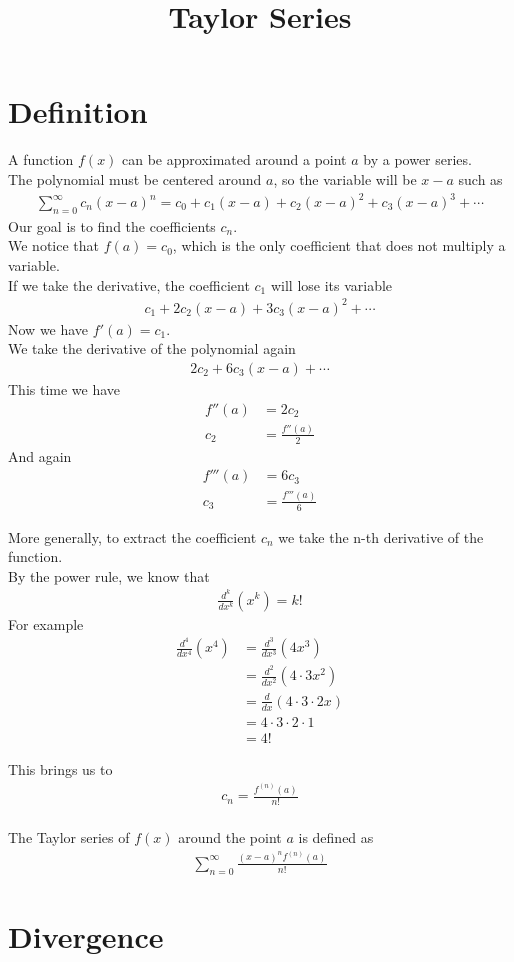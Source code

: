 \documentclass[preview]{standalone}
\begin{document}
\title{Taylor Series}
\genpage

\section{Definition}

A function \(f(x)\) can be approximated around a point \(a\) by a power series.
\\
The polynomial must be centered around \(a\), so the variable will be \(x-a\) such as
\begin{align*}
    \sum_{n=0}^{\infty}c_n{(x-a)}^n
    =c_0+c_1(x-a)+c_2{(x-a)}^2+c_3{(x-a)}^3+\cdots
\end{align*}
Our goal is to find the coefficients \(c_n\).
\\
We notice that \(f(a)=c_0\), which is the only coefficient that does not multiply a variable.
\\
If we take the derivative, the coefficient \(c_1\) will lose its variable
\begin{align*}
    c_1+2c_2(x-a)+3c_3{(x-a)}^2+\cdots
\end{align*}
Now we have \(f'(a)=c_1\).
\\
We take the derivative of the polynomial again
\begin{align*}
    2c_2+6c_3(x-a)+\cdots
\end{align*}
This time we have
\begin{align*}
    f''(a)&=2c_2\\
    c_2&=\frac{f''(a)}{2}
\end{align*}
And again
\begin{align*}
    f'''(a)&=6c_3\\
    c_3&=\frac{f'''(a)}{6}
\end{align*}

More generally, to extract the coefficient \(c_n\) we take the n-th derivative of the function.
\\
By the power rule, we know that
\begin{align*}
    \frac{d^k}{dx^k}\left(x^k\right)=k!
\end{align*}
For example
\begin{align*}
    \frac{d^4}{dx^4}\left(x^4\right)
    &=\frac{d^3}{dx^3}\left(4x^3\right)\\
    &=\frac{d^2}{dx^2}\left(4\cdot 3x^2\right)\\
    &=\frac{d}{dx}\left(4\cdot 3\cdot 2x\right)\\
    &=4\cdot 3\cdot 2\cdot 1\\
    &=4!
\end{align*}

This brings us to
\begin{align*}
    c_n=\frac{f^{(n)}(a)}{n!}
\end{align*}
\\
The Taylor series of \(f(x)\) around the point \(a\) is defined as
\begin{align*}
    \sum_{n=0}^{\infty}\frac{{(x-a)}^n f^{(n)}(a)}{n!}
\end{align*}

\pagebreak

\section{Divergence}
\end{document}
